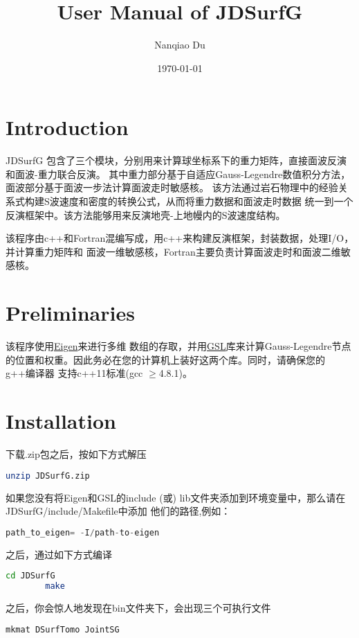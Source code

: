 \documentclass[10p,UTF8]{ctexart}
\title{User Manual of JDSurfG}
\author{Nanqiao Du}
\date{\today}
\begin{document}
   \maketitle
   \tableofcontents
   \newpage
   \section{Introduction}
   JDSurfG 包含了三个模块，分别用来计算球坐标系下的重力矩阵，直接面波反演和面波-重力联合反演。
   其中重力部分基于自适应Gauss-Legendre数值积分方法，面波部分基于面波一步法计算面波走时敏感核。
   该方法通过岩石物理中的经验关系式构建S波速度和密度的转换公式，从而将重力数据和面波走时数据
   统一到一个反演框架中。该方法能够用来反演地壳-上地幔内的S波速度结构。

   该程序由c++和Fortran混编写成，用c++来构建反演框架，封装数据，处理I/O，并计算重力矩阵和
   面波一维敏感核，Fortran主要负责计算面波走时和面波二维敏感核。

   \section{Preliminaries}
   该程序使用\href{http://eigen.tuxfamily.org/index.php?title=Main_Page}{Eigen}来进行多维
   数组的存取，并用\href{http://www.gnu.org/software/gsl/}{GSL}库来计算Gauss-Legendre节点
   的位置和权重。因此务必在您的计算机上装好这两个库。同时，请确保您的g++编译器
   支持c++11标准(gcc $\geq$4.8.1)。

    \section{Installation}
    下载.zip包之后，按如下方式解压
    \begin{lstlisting}[language=bash]
        unzip JDSurfG.zip
    \end{lstlisting}
    如果您没有将Eigen和GSL的include (或) lib文件夹添加到环境变量中，那么请在JDSurfG/include/Makefile中添加
    他们的路径,例如：
    \begin{lstlisting}[language=c]
        path_to_eigen= -I/path-to-eigen
    \end{lstlisting}
    之后，通过如下方式编译
    \begin{lstlisting}[language=bash]
        cd JDSurfG
        make
    \end{lstlisting}
    之后，你会惊人地发现在bin文件夹下，会出现三个可执行文件
    \begin{lstlisting}[language=bash]
       mkmat DSurfTomo JointSG  
    \end{lstlisting}
\end{document}

